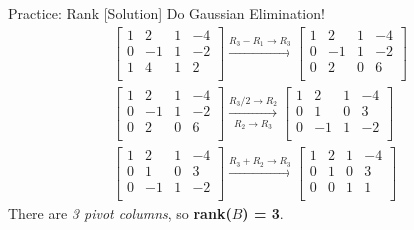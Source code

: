 \begin{frame}{Practice: Rank [Solution]}
    Do Gaussian Elimination!
    \begin{align*}
        \begin{bmatrix}
            1 & 2 & 1 & -4 \\
            0 & -1 & 1 & -2 \\
            1 &  4 & 1 & 2 \\
        \end{bmatrix} \xrightarrow[]{R_3 - R_1 \to R_3}
        \begin{bmatrix}
            1 & 2 & 1 & -4 \\
            0 & -1 & 1 & -2 \\
            0 &  2 & 0 & 6 \\
        \end{bmatrix} \\[1ex]
        \begin{bmatrix}
            1 & 2 & 1 & -4 \\
            0 & -1 & 1 & -2 \\
            0 &  2 & 0 & 6 \\
        \end{bmatrix} \xrightarrow[R_2 \to R_3]{R_3 / 2 \to R_2}
        \begin{bmatrix}
            1 & 2 & 1 & -4 \\
            0 &  1 & 0 & 3 \\
            0 & -1 & 1 & -2 \\
        \end{bmatrix} \\[1ex]
        \begin{bmatrix}
            1 & 2 & 1 & -4 \\
            0 &  1 & 0 & 3 \\
            0 & -1 & 1 & -2 \\
        \end{bmatrix} \xrightarrow[]{R_3 + R_2 \to R_3}
        \begin{bmatrix}
            \boxed{1} & 2 & 1 & -4 \\
            0 &  \boxed{1} & 0 & 3 \\
            0 & 0 & \boxed{1} & 1 \\
        \end{bmatrix}
    \end{align*}
    There are \textit{3 pivot columns}, so \textbf{rank($B$) = 3}.
\end{frame}